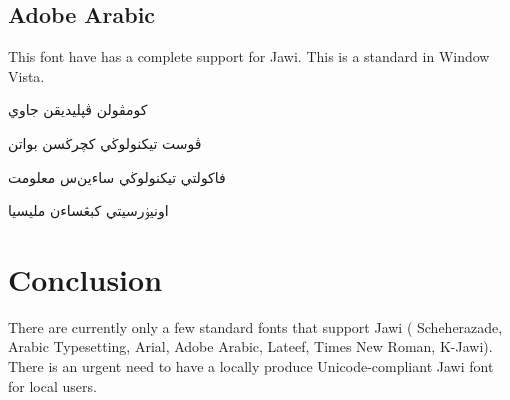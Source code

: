 \documentclass[12pt,a4paper]{IEEEconf}
\begin{document}
\subsection{Adobe Arabic}
This font have has a complete support for Jawi. This is a standard in Window Vista.
\newfontfamily{}

\begin{arab}
\begin{center}
کومڤولن ڤڽليديقن جاوي
\par  
ڤوست تيكنولوڬي کچرڬسن بواتن
\par  
فاکولتي تيكنولوڬي ساءين‌س معلومت
\par  
اونيۏرسيتي کبڠساءن مليسيا
\par  
\end{center}
\end{arab}

\section{Conclusion}

There are currently only a few standard fonts that support Jawi ( Scheherazade, Arabic Typesetting, Arial, Adobe Arabic, 
Lateef, Times New Roman, K-Jawi). There is an urgent need to have a locally produce Unicode-compliant Jawi font for local users.
\end{document}
